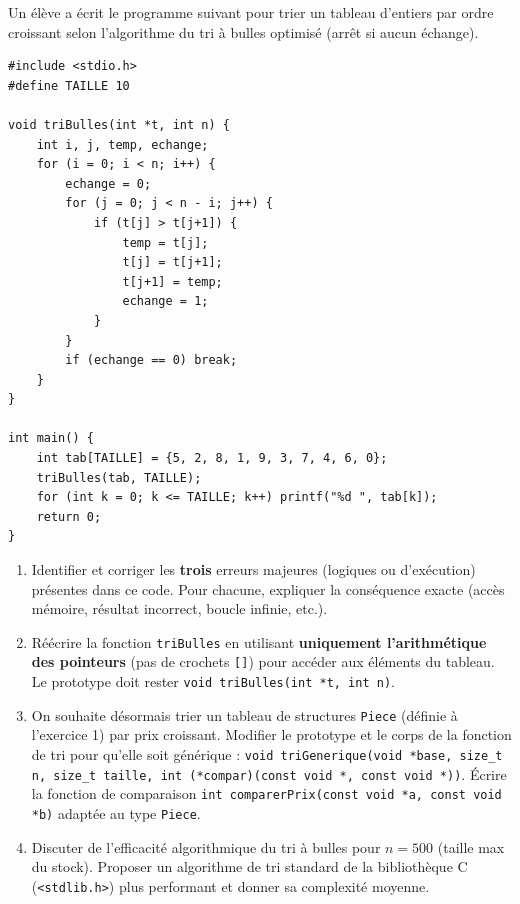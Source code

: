\documentclass[11pt]{article}
\begin{document}
\begin{exercice}
Un élève a écrit le programme suivant pour trier un tableau d'entiers par ordre croissant selon l'algorithme du tri à bulles optimisé (arrêt si aucun échange).

\begin{verbatim}
#include <stdio.h>
#define TAILLE 10

void triBulles(int *t, int n) {
    int i, j, temp, echange;
    for (i = 0; i < n; i++) {
        echange = 0;
        for (j = 0; j < n - i; j++) {
            if (t[j] > t[j+1]) {
                temp = t[j];
                t[j] = t[j+1];
                t[j+1] = temp;
                echange = 1;
            }
        }
        if (echange == 0) break;
    }
}

int main() {
    int tab[TAILLE] = {5, 2, 8, 1, 9, 3, 7, 4, 6, 0};
    triBulles(tab, TAILLE);
    for (int k = 0; k <= TAILLE; k++) printf("%d ", tab[k]);
    return 0;
}
\end{verbatim}

\begin{enumerate}
    \item Identifier et corriger les \textbf{trois} erreurs majeures (logiques ou d'exécution) présentes dans ce code. Pour chacune, expliquer la conséquence exacte (accès mémoire, résultat incorrect, boucle infinie, etc.).
    \item Réécrire la fonction \texttt{triBulles} en utilisant \textbf{uniquement l'arithmétique des pointeurs} (pas de crochets \texttt{[]}) pour accéder aux éléments du tableau. Le prototype doit rester \texttt{void triBulles(int *t, int n)}.
    \item On souhaite désormais trier un tableau de structures \texttt{Piece} (définie à l'exercice 1) par prix croissant. Modifier le prototype et le corps de la fonction de tri pour qu'elle soit générique : \texttt{void triGenerique(void *base, size\_t n, size\_t taille, int (*compar)(const void *, const void *))}. Écrire la fonction de comparaison \texttt{int comparerPrix(const void *a, const void *b)} adaptée au type \texttt{Piece}.
    \item Discuter de l'efficacité algorithmique du tri à bulles pour $n=500$ (taille max du stock). Proposer un algorithme de tri standard de la bibliothèque C (\texttt{<stdlib.h>}) plus performant et donner sa complexité moyenne.
\end{enumerate}
\end{exercice}
\end{document}
